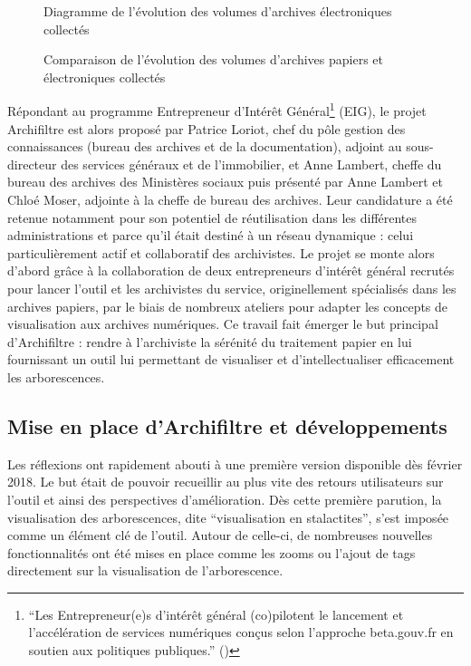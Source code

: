 \begin{figure}[h]
\begin{minipage}[b]{0.45\textwidth}
		\caption{Diagramme de l’évolution des volumes d’archives  électroniques collectés}
		\label{figure7.2}
	\end{minipage}
	\caption{Comparaison de l'évolution des volumes d'archives papiers et électroniques collectés\protect\footnotemark}
	\label{fig:sidebyside1}
\end{figure}

Répondant au programme Entrepreneur d'Intérêt Général\footnote{\enquote{Les Entrepreneur(e)s d’intérêt général (co)pilotent le lancement et l'accélération de services numériques conçus selon l'approche beta.gouv.fr en soutien aux politiques publiques.} (\cite{noauthor_entrepreneur_nodate})} (EIG), le projet \gls{Archifiltre} est alors proposé par Patrice Loriot,  chef du pôle gestion des connaissances (bureau des archives et de la documentation), adjoint au sous-directeur des services généraux et de l'immobilier, et Anne Lambert, cheffe du bureau des archives des Ministères sociaux puis présenté par Anne Lambert et Chloé Moser, adjointe à la cheffe de bureau des archives. Leur candidature a été retenue notamment pour son potentiel de réutilisation dans les différentes administrations et parce qu’il était destiné à un réseau dynamique : celui particulièrement actif et collaboratif des archivistes. Le projet se monte alors d’abord grâce à la collaboration de deux entrepreneurs d’intérêt général recrutés pour lancer l’outil  et les archivistes du service, originellement spécialisés dans les archives papiers, par le biais de nombreux ateliers pour adapter les concepts de visualisation aux archives numériques. Ce travail fait émerger le but principal d’\gls{Archifiltre} : rendre à l’archiviste la sérénité du traitement papier en lui fournissant un outil lui permettant de visualiser et d’intellectualiser efficacement les arborescences.

\subsection{Mise en place d’Archifiltre et développements}
Les réflexions ont rapidement abouti à une première version disponible dès février 2018. Le but était de pouvoir recueillir au plus vite des retours utilisateurs sur l’outil et ainsi des perspectives d’amélioration. Dès cette première parution, la visualisation des arborescences, dite \enquote{visualisation en stalactites}, s’est imposée comme un élément clé de l’outil. Autour de celle-ci, de nombreuses nouvelles fonctionnalités ont été mises en place comme les zooms ou l'ajout de tags directement sur la visualisation de l’arborescence.


